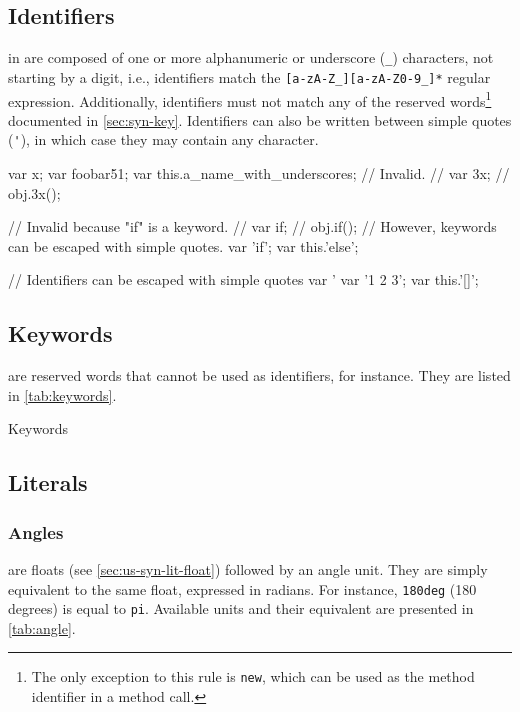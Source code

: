 \subsection{Identifiers}
\label{sec:us-syn-id}

 in \us are composed of one or more alphanumeric or
underscore (\lstinline|_|) characters, not starting by a digit, i.e.,
identifiers match the \lstinline|[a-zA-Z_][a-zA-Z0-9_]*| regular
expression.  Additionally, identifiers must not match any of the \us
reserved words\footnote{
  The only exception to this rule is \lstinline|new|, which can be
  used as the method identifier in a method call.
} documented in \autoref{sec:syn-key}. Identifiers can also be written
between simple quotes (\lstinline|'|), in which case they may contain
any character.

\begin{urbiscript}
var x;
var foobar51;
var this.a_name_with_underscores;
// Invalid.
// var 3x;
// obj.3x();

// Invalid because "if" is a keyword.
// var if;
// obj.if();
// However, keywords can be escaped with simple quotes.
var 'if';
var this.'else';

// Identifiers can be escaped with simple quotes
var '%
var '1 2 3';
var this.'[]';
\end{urbiscript}

\subsection{Keywords}
\label{sec:syn-key}

 are reserved words that cannot be used as identifiers,
for instance.  They are listed in \autoref{tab:keywords}.

\renewcommand{\baselinestretch}{.85}
\begin{table}[\floatpos]
  \centering
  
  \caption{Keywords}
  \label{tab:keywords}
\end{table}
\renewcommand{\baselinestretch}{1}

\subsection{Literals}

\subsubsection{Angles}

 are floats (see \autoref{sec:us-syn-lit-float})
followed by an angle unit. They are simply equivalent to the same
float, expressed in radians. For instance, \lstinline|180deg| (180
degrees) is equal to \lstinline|pi|. Available units and their
equivalent are presented in \autoref{tab:angle}.

